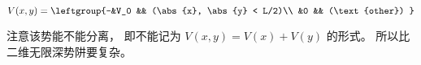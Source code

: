 
\begin{issues}
\issueDraft
\end{issues}

\begin{equation}
V(x,y) = \leftgroup{-&V_0 && (\abs{x}, \abs{y} < L/2)\\
&0 && (\text{other}) }
\end{equation}

注意该势能不能分离， 即不能记为 $V(x,y) = V(x) + V(y)$ 的形式。 所以比二维无限深势阱要复杂。

